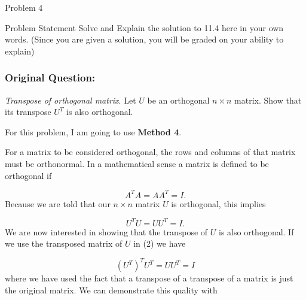\begin{problem}{Problem 4}
    \begin{statement}{Problem Statement}
        Solve and Explain the solution to 11.4 here in your own words. (Since you are given a solution, you will be graded on your ability to explain)

        \subsubsection*{Original Question:}

        \textit{Transpose of orthogonal matrix}. Let $U$ be an orthogonal $n \times n$ matrix. Show that its transpose $U^{T}$ is also orthogonal.
    \end{statement}
    \begin{highlight}[Solution]
        \noindent For this problem, I am going to use \textbf{Method 4}. \vspace*{1em}

        For a matrix to be considered orthogonal, the rows and columns of that matrix must be orthonormal. In a mathematical sense a matrix is defined to be orthogonal if

        \setcounter{equation}{0}
        \begin{equation}
            A^{T}A = AA^{T} = I.
        \end{equation}
        Because we are told that our $n \times n$ matrix $U$ is orthogonal, this implies

        \begin{equation}
            U^{T}U = UU^{T} = I.
        \end{equation}
        We are now interested in showing that the transpose of $U$ is also orthogonal. If we use the transposed matrix of $U$ in (2) we have

        \begin{equation}
            (U^{T})^{T}U^{T} = UU^{T} = I
        \end{equation}
        where we have used the fact that a transpose of a transpose of a matrix is just the original matrix. We can demonstrate this quality with


\end{highlight}
\end{problem}
